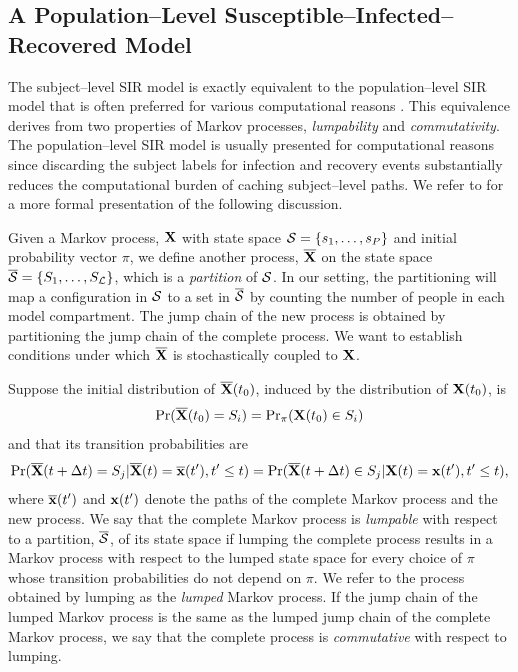\subsection{A Population--Level Susceptible--Infected--Recovered Model}
\label{subsec:sir_population_mod}
The subject--level SIR model is exactly equivalent to the population--level SIR model that is often preferred for various computational reasons \cite{allen2008introduction, andersson2000stochastic}. This equivalence derives from two properties of Markov processes, \textit{lumpability} and \textit{commutativity}. The population--level SIR model is usually presented for computational reasons since discarding the subject labels for infection and recovery events substantially reduces the computational burden of caching subject--level paths. We refer to \cite{tian2006lumpability} for a more formal presentation of the following discussion. 

Given a Markov process, $ \mathbf{X} $ with state space $ \mathcal{S} = \lbrace s_1,\dots,s_P\rbrace $ and initial probability vector $ \pi $, we define another process, $ \overline{\mathbf{X}} $ on the state space $ \overline{\mathcal{S}} = \lbrace S_1,\dots,S_\mathcal{L}\rbrace $, which is a \textit{partition} of $ \mathcal{S} $. In our setting, the partitioning will map a configuration in $ \mathcal{S} $ to a set in $ \overline{\mathcal{S}} $ by counting the number of people in each model compartment. The jump chain of the new process is obtained by partitioning the jump chain of the complete process. We want to establish conditions under which $ \overline{\mathbf{X}} $ is stochastically coupled to $ \mathbf{X} $. 

Suppose the initial distribution of $ \overline{\mathbf{X}}(t_0) $, induced by the distribution of $ \mathbf{X}(t_0) $, is \begin{equation*}
\Pr(\overline{\mathbf{X}}(t_0) = S_i) = \mathrm{Pr}_\pi(\mathbf{X}(t_0) \in S_i)
\end{equation*}
and that its transition probabilities are
\begin{equation*}
\Pr(\overline{\mathbf{X}}(t+\Delta t) = S_j | \overline{\mathbf{X}}(t)=\overline{\mathbf{x}}(t^\prime), t^\prime \leq t) = \Pr(\overline{\mathbf{X}}(t+\Delta t) \in S_j | \mathbf{X}(t)=\mathbf{x}(t^\prime), t^\prime \leq t),
\end{equation*}
where $ \overline{\mathbf{x}}(t^\prime) $  and $ \mathbf{x}(t^\prime) $ denote the paths of the complete Markov process and the new process. We say that the complete Markov process is \textit{lumpable} with respect to a partition, $ \overline{\mathcal{S}} $, of its state space if lumping the complete process results in a Markov process with respect to the lumped state space for every choice of $ \pi $ whose transition probabilities do not depend on $ \pi $. We refer to the process obtained by lumping as the \textit{lumped} Markov process. If the jump chain of the lumped Markov process is the same as the lumped jump chain of the complete Markov process, we say that the complete process is \textit{commutative} with respect to lumping.  

